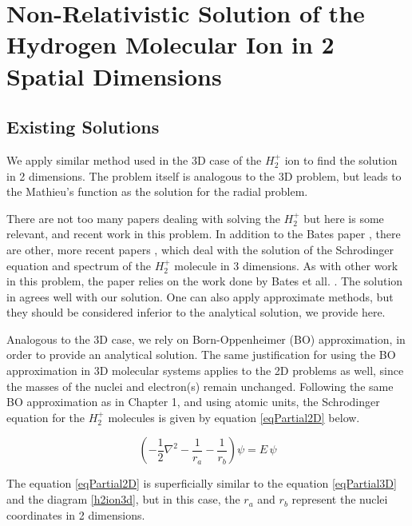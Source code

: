 \chapter{Non-Relativistic Solution of the Hydrogen Molecular Ion in 2 Spatial Dimensions}
\label{h2plus2DPotential}

\section{Existing Solutions}

We apply similar method used in the 3D case of the $ H_2^{+} $ ion to find the solution in 2 dimensions. The problem itself is analogous to the 3D problem, but leads to the Mathieu's function as the solution for the radial problem.

There are not too many papers dealing with solving the $ H_2^{+} $ but here is some relevant, and recent work in this problem. In addition to the Bates paper \cite{Bates1}, there are other, more recent papers \cite{H2Plus2d1} \cite{TwoCentersParticle}, \cite{Kolos} which deal with the solution of the Schrodinger equation and spectrum of the $ H_2^{+} $ molecule in 3 dimensions.  As with other work in this problem, the paper relies on the work done by Bates et all. \cite{Bates1}. The solution in \cite{H2Plus2d1} agrees well with our solution.  One can also apply approximate methods, but they should be considered inferior to the analytical solution, we provide here. 

Analogous to the 3D case, we rely on Born-Oppenheimer (BO) approximation, in order to provide an analytical solution. The same justification for using the BO approximation in 3D molecular systems applies to the 2D problems as well, since the masses of the nuclei and electron(s) remain unchanged.  Following the same BO approximation as in Chapter 1, and using atomic units, the Schrodinger equation for the $ H_2^{+} $ molecules is given by equation \eqref{eqPartial2D} below. 


\begin{equation}\label{eqPartial2D}
\left(-\frac{1}{2}\nabla^2-\frac{1}{r_a}-\frac{1}{r_b}\right)\psi = E\,\psi
\end{equation}

The equation \eqref{eqPartial2D} is superficially similar to the equation \eqref{eqPartial3D} and the diagram \ref{h2ion3d}, but in this case, the $ r_a $ and $ r_b $ represent the nuclei coordinates in 2 dimensions.

